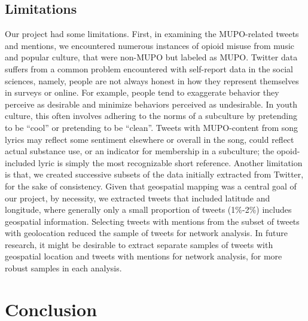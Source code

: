 \documentclass[sigconf]{acmart}
\begin{document}

\subsection{Limitations}

Our project had some limitations. First, in examining the MUPO-related tweets 
and mentions, we encountered numerous instances of opioid misuse from music and 
popular culture, that were non-MUPO but labeled as MUPO. Twitter data suffers 
from a common problem encountered with self-report data in the social sciences, 
namely, people are not always honest in how they represent themselves in surveys
or online. For example, people tend to exaggerate behavior they perceive as 
desirable and minimize behaviors perceived as undesirable. In youth culture, 
this often involves adhering to the norms of a subculture by pretending to be 
``cool'' or pretending to be ``clean''. Tweets with MUPO-content from song 
lyrics may reflect some sentiment elsewhere or overall in the song, could
reflect actual substance use, or an indicator for membership in a subculture; 
the opoid-included lyric is simply the most recognizable short reference. 
Another limitation is that, we created successive subsets of the data  initially 
extracted from Twitter, for the sake of consistency. Given that geospatial 
mapping was a central goal of our project, by necessity, we extracted tweets 
that included latitude and longitude, where generally only a small proportion 
of tweets (1\%-2\%) includes geospatial information. Selecting tweets with 
mentions from the subset of tweets with geolocation reduced the sample of 
tweets for network analysis. In future research, it might be desirable to 
extract separate samples of tweets with geospatial location and tweets with 
mentions for network analysis, for more robust samples in each analysis. 

\section{Conclusion}
\end{document}
